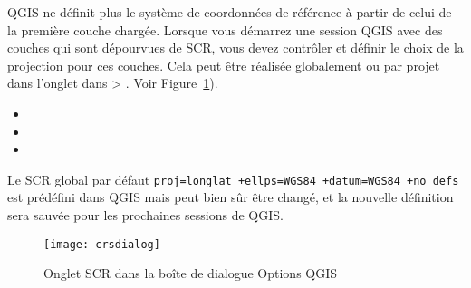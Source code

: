 QGIS ne définit plus le système de coordonnées de référence à partir de 
celui de la première couche chargée. Lorsque vous démarrez
une session QGIS avec des couches qui sont dépourvues de SCR, vous devez
contrôler et définir le choix de la projection pour ces couches. Cela peut
être réalisée globalement ou par projet dans l'onglet  dans  > . 
Voir Figure~\ref{fig:crsdialog}).

\begin{itemize}
\item {}
\item {}
\item {}
\end{itemize}

Le SCR global par défaut \texttt{proj=longlat +ellps=WGS84 +datum=WGS84
 +no\_defs} est prédéfini dans QGIS mais peut bien sûr être changé, et la
nouvelle définition sera sauvée pour les prochaines sessions de QGIS.

\begin{figure}[ht]
   \begin{center}
   \caption{Onglet SCR dans la boîte de dialogue Options QGIS
\nixcaption}\label{fig:crsdialog}\smallskip
   \texttt{[image: crsdialog]}
\end{center}
\end{figure}

